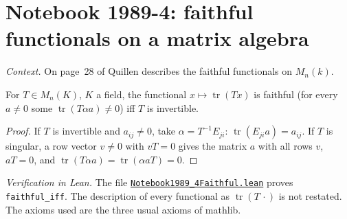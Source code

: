 \section[Notebook 1989-4: faithful functionals on matrices]{Notebook 1989-4: faithful functionals on a matrix algebra\protect{}}\label{sec:quillen-1989-4-faithful}

\emph{Context.} On page~28 of  Quillen describes the faithful functionals on $M_n(k)$.

\begin{encadre}
\begin{theoreme}\label{thm:quillen-1989-4-faithful}
For $T \in M_n(K)$, $K$ a field, the functional $x \mapsto \operatorname{tr}(Tx)$ is faithful (for every $a \ne 0$ some $\operatorname{tr}(T\alpha a) \ne 0$) iff $T$ is invertible.
\end{theoreme}
\end{encadre}

\begin{proof}
If $T$ is invertible and $a_{ij} \ne 0$, take $\alpha = T^{-1}E_{ji}$: $\operatorname{tr}(E_{ji}a) = a_{ij}$. If $T$ is singular, a row vector $v \ne 0$ with $vT = 0$ gives the matrix $a$ with all rows $v$, $aT = 0$, and $\operatorname{tr}(T\alpha a) = \operatorname{tr}(\alpha aT) = 0$.
\end{proof}

\emph{Verification in Lean.} The file \href{\leanblobmain/Notebook1989_4Faithful.lean}{\texttt{Notebook1989\_4Faithful.\allowbreak{}lean}} proves \texttt{faithful\_iff}. The description of every functional as $\operatorname{tr}(T\,\cdot)$ is not restated. The axioms used are the three usual axioms of mathlib.

